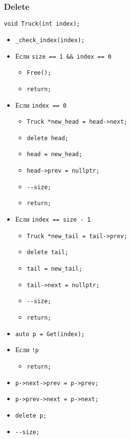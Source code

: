 \subsubsection*{Delete}

\begin{lstlisting}
void Truck(int index);
\end{lstlisting}

\begin{itemize}
	\item \verb|_check_index(index);|
	\item Если \verb|size == 1 && index == 0|
	\begin{itemize}
		\item \verb|Free();|
		\item \verb|return;|
	\end{itemize}
	\item Если \verb|index == 0|
	\begin{itemize}
		\item \verb|Truck *new_head = head->next;|
		\item \verb|delete head;|
		\item \verb|head = new_head;|
		\item \verb|head->prev = nullptr;|
		\item \verb|--size;|
		\item \verb|return;|
	\end{itemize}
	\item Если \verb|index == size - 1|
	\begin{itemize}
		\item \verb|Truck *new_tail = tail->prev;|
		\item \verb|delete tail;|
		\item \verb|tail = new_tail;|
		\item \verb|tail->next = nullptr;|
		\item \verb|--size;|
		\item \verb|return;|
	\end{itemize}
	\item \verb|auto p = Get(index);|
	\item Если \verb|!p|
	\begin{itemize}
		\item \verb|return;|
	\end{itemize}
	\item \verb|p->next->prev = p->prev;|
	\item \verb|p->prev->next = p->next;|
	\item \verb|delete p;|
	\item \verb|--size;|
\end{itemize}

